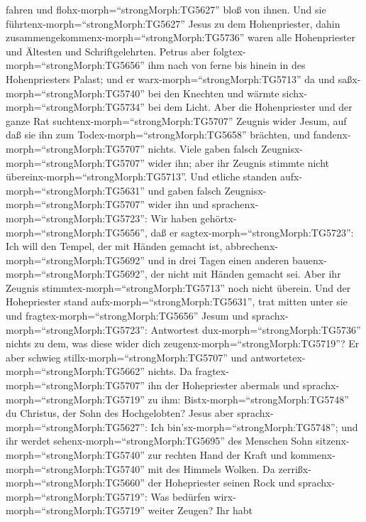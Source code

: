 fahren und flohx-morph=``strongMorph:TG5627'' bloß von ihnen.
 Und sie führtenx-morph=``strongMorph:TG5627'' Jesus zu dem
Hohenpriester, dahin zusammengekommenx-morph=``strongMorph:TG5736''
waren alle Hohenpriester und Ältesten und Schriftgelehrten.
 Petrus aber folgtex-morph=``strongMorph:TG5656'' ihm nach
von ferne bis hinein in des Hohenpriesters Palast; und er
warx-morph=``strongMorph:TG5713'' da und
saßx-morph=``strongMorph:TG5740'' bei den Knechten und wärmte
sichx-morph=``strongMorph:TG5734'' bei dem Licht.  Aber die
Hohenpriester und der ganze Rat suchtenx-morph=``strongMorph:TG5707''
Zeugnis wider Jesum, auf daß sie ihn zum
Todex-morph=``strongMorph:TG5658'' brächten, und
fandenx-morph=``strongMorph:TG5707'' nichts.  Viele gaben
falsch Zeugnisx-morph=``strongMorph:TG5707'' wider ihn; aber ihr Zeugnis
stimmte nicht übereinx-morph=``strongMorph:TG5713''.  Und
etliche standen aufx-morph=``strongMorph:TG5631'' und gaben falsch
Zeugnisx-morph=``strongMorph:TG5707'' wider ihn und
sprachenx-morph=``strongMorph:TG5723'':  Wir haben
gehörtx-morph=``strongMorph:TG5656'', daß er
sagtex-morph=``strongMorph:TG5723'': Ich will den Tempel, der mit Händen
gemacht ist, abbrechenx-morph=``strongMorph:TG5692'' und in drei Tagen
einen anderen bauenx-morph=``strongMorph:TG5692'', der nicht mit Händen
gemacht sei.  Aber ihr Zeugnis
stimmtex-morph=``strongMorph:TG5713'' noch nicht überein. 
Und der Hohepriester stand aufx-morph=``strongMorph:TG5631'', trat
mitten unter sie und fragtex-morph=``strongMorph:TG5656'' Jesum und
sprachx-morph=``strongMorph:TG5723'': Antwortest
dux-morph=``strongMorph:TG5736'' nichts zu dem, was diese wider dich
zeugenx-morph=``strongMorph:TG5719''?  Er aber schwieg
stillx-morph=``strongMorph:TG5707'' und
antwortetex-morph=``strongMorph:TG5662'' nichts. Da
fragtex-morph=``strongMorph:TG5707'' ihn der Hohepriester abermals und
sprachx-morph=``strongMorph:TG5719'' zu ihm:
Bistx-morph=``strongMorph:TG5748'' du Christus, der Sohn des
Hochgelobten?  Jesus aber
sprachx-morph=``strongMorph:TG5627'': Ich
bin'sx-morph=``strongMorph:TG5748''; und ihr werdet
sehenx-morph=``strongMorph:TG5695'' des Menschen Sohn
sitzenx-morph=``strongMorph:TG5740'' zur rechten Hand der Kraft und
kommenx-morph=``strongMorph:TG5740'' mit des Himmels Wolken.
 Da zerrißx-morph=``strongMorph:TG5660'' der Hohepriester
seinen Rock und sprachx-morph=``strongMorph:TG5719'': Was bedürfen
wirx-morph=``strongMorph:TG5719'' weiter Zeugen?  Ihr habt

